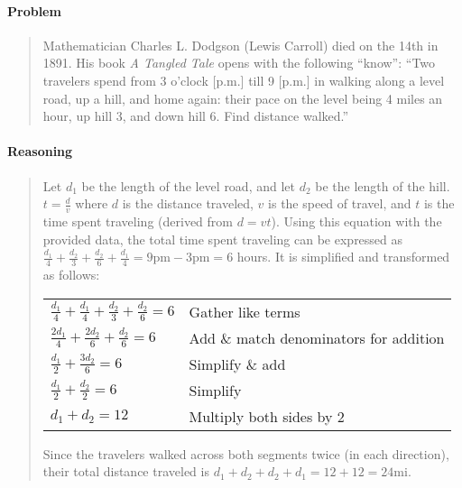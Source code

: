 \documentclass[letterpaper,12pt,twoside]{report}
\begin{document}
	\pagestyle{fancy}
	\fancyhf{}
	
	\paragraph{Problem}
	\begin{quote}
		\textsf{Mathematician Charles L. Dodgson (Lewis Carroll) died on the 14th in 1891. His book \textit{A Tangled Tale} opens with the following ``know'': ``Two travelers spend
			from 3 o'clock [p.m.] till 9 [p.m.] in
			walking along a level road, up a hill, and
			home again: their pace on the level being
			4 miles an hour, up hill 3, and down hill 6.
			Find distance walked.''}
	\end{quote}
	
	\begin{center}
	\end{center}
	
	\paragraph{Reasoning}
	\begin{quotation}
		
		Let $d_1$ be the length of the level road, and let $d_2$ be the length of the hill. $t=\frac{d}{v}$ where $d$ is the distance traveled, $v$ is the speed of travel, and $t$ is the time spent traveling (derived from $d=vt$). Using this equation with the provided data, the total time spent traveling can be expressed as $\frac{d_1}{4}+\frac{d_2}{3}+\frac{d_2}{6}+\frac{d_1}{4}=9\text{pm}-3\text{pm}=6$ hours. It is simplified and transformed as follows:
		
		\begin{center}
			\begin{tabular}{l | l}
				$\frac{d_1}{4}+\frac{d_1}{4}+\frac{d_2}{3}+\frac{d_2}{6}=6$ & Gather like terms \\
				$\frac{2d_1}{4}+\frac{2d_2}{6}+\frac{d_2}{6}=6$ & Add \& match denominators for addition \\
				$\frac{d_1}{2}+\frac{3d_2}{6}=6$ & Simplify \& add \\
				$\frac{d_1}{2}+\frac{d_2}{2}=6$ & Simplify \\
				$d_1+d_2=12$ & Multiply both sides by 2
			\end{tabular}
		\end{center}
	
	Since the travelers walked across both segments twice (in each direction), their total distance traveled is $d_1+d_2+d_2+d_1=12+12=\boxed{24 \text{mi}}$.
	\end{quotation}
	
\end{document}
